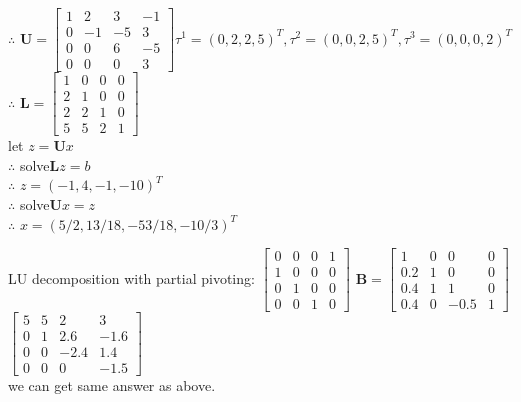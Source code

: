 \documentclass[english,onecolumn]{IEEEtran}
\begin{document}
\begin{enumerate}
	$\therefore$ $\mathbf{U} = 
		\begin{bmatrix}
			1 & 2 & 3 & -1\\
			0 & -1 & -5 & 3\\
			0 & 0 & 6 & -5\\
			0 & 0 & 0 & 3
		\end{bmatrix}
	\tau^1=(0,2,2,5)^T,\tau^2=(0,0,2,5)^T,\tau^3=(0,0,0,2)^T$\\
	$\therefore$ $\mathbf{L}=
		\begin{bmatrix}
			1 & 0 & 0 & 0\\
			2 & 1 & 0 & 0\\
			2 & 2 & 1 & 0\\
			5 & 5 & 2 & 1
		\end{bmatrix}$\\
	let $z=\mathbf{U}x$\\
	$\therefore$ solve$\mathbf{L}z=b$\\
	$\therefore$ $z=(-1,4,-1,-10)^T$\\
	$\therefore$ solve$\mathbf{U}x=z$\\
	$\therefore$ $x=(5/2,13/18,-53/18,-10/3)^T$
	
	
	
	
	
	

      LU decomposition with partial pivoting:
      $ \begin{bmatrix}
      0 & 0 & 0 & 1  \\
      1 & 0 & 0 & 0\\
      0 & 1 & 0 & 0\\
      0 & 0 & 1 & 0     
      \end{bmatrix}$
      $\mathbf{B}=\begin{bmatrix}
      1 & 0 & 0 & 0  \\
      0.2 & 1 & 0 & 0\\
      0.4 & 1 & 1 & 0\\
      0.4 & 0 & -0.5 & 1     
      \end{bmatrix}$ 
      $\begin{bmatrix}
      5 & 5 & 2 & 3  \\
      0 & 1 & 2.6 & -1.6\\
      0 & 0 & -2.4 & 1.4\\
      0 & 0 & 0 & -1.5     
      \end{bmatrix}$\\
      we can get same answer as above.
\end{enumerate}
\end{document}
